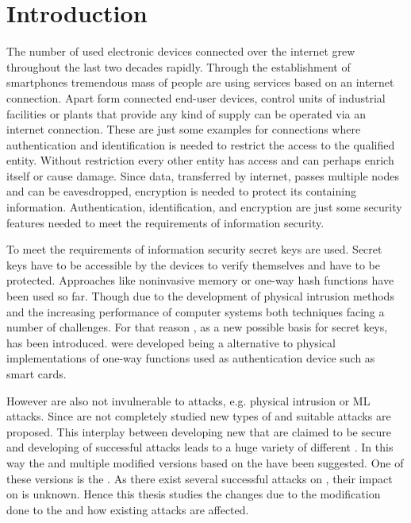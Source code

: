 \chapter{Introduction}

The number of used electronic devices connected over the internet grew throughout the last two decades rapidly.
Through the establishment of smartphones tremendous mass of people are using services based on an internet connection.
Apart form connected end-user devices, control units of industrial facilities or plants that provide any kind of supply can be operated via an internet connection.
These are just some examples for connections where authentication and identification is needed to restrict the access to the qualified entity.
Without restriction every other entity has access and can perhaps enrich itself or cause damage.
Since data, transferred by internet, passes multiple nodes and can be eavesdropped, encryption is needed to protect its containing information.
Authentication, identification, and encryption are just some security features needed to meet the requirements of information security.

To meet the requirements of information security secret keys are used.
Secret keys have to be accessible by the devices to verify themselves and have to be protected.
Approaches like noninvasive memory or one-way hash functions have been used so far.
Though due to the development of physical intrusion methods and the increasing performance of computer systems both techniques facing a number of challenges.
For that reason \pufs, as a new possible basis for secret keys, has been introduced.
\pufs were developed being a alternative to physical implementations of one-way functions used as authentication device such as smart cards. %


However \pufs are also not invulnerable to attacks, e.g. physical intrusion or \acl{ML} attacks.
Since \pufs are not completely studied new types of \pufs and suitable attacks are proposed.
This interplay between developing new \pufs that are claimed to be secure and developing of successful attacks leads to a huge variety of different \pufs.
In this way the \apuf and multiple modified versions based on the \apuf have been suggested.
One of these versions is the \mpuf.
As there exist several successful attacks on \apufs, their impact on \mpuf is unknown. %
Hence this thesis studies the changes due to the modification done to the \apuf and how existing attacks are affected.

